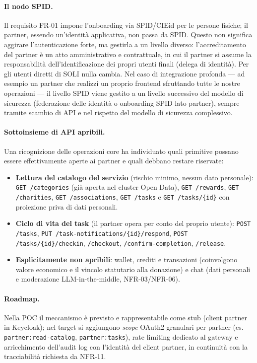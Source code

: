 \documentclass[11pt,a4paper]{article}
\begin{document}
\paragraph{Il nodo SPID.} Il requisito FR-01 impone l'onboarding via SPID/CIEid per le persone fisiche; il partner, essendo un'identit\`a applicativa, non passa da SPID. Questo non significa aggirare l'autenticazione forte, ma gestirla a un livello diverso: l'accreditamento del partner \`e un atto amministrativo e contrattuale, in cui il partner si assume la responsabilit\`a dell'identificazione dei propri utenti finali (delega di identit\`a). Per gli utenti diretti di SOLI nulla cambia. Nel caso di integrazione profonda --- ad esempio un partner che realizzi un proprio frontend sfruttando tutte le nostre operazioni --- il livello SPID viene gestito a un livello successivo del modello di sicurezza (federazione delle identit\`a o onboarding SPID lato partner), sempre tramite scambio di API e nel rispetto del modello di sicurezza complessivo.

\paragraph{Sottoinsieme di API apribili.} Una ricognizione delle operazioni core ha individuato quali primitive possano essere effettivamente aperte ai partner e quali debbano restare riservate:

\begin{itemize}[leftmargin=1.4em]
  \item \textbf{Lettura del catalogo del servizio} (rischio minimo, nessun dato personale): \texttt{GET /categories} (gi\`a aperta nel cluster Open Data), \texttt{GET /rewards}, \texttt{GET /charities}, \texttt{GET /associations}, \texttt{GET /tasks} e \texttt{GET /tasks/\{id\}} con proiezione priva di dati personali.
  \item \textbf{Ciclo di vita del task} (il partner opera per conto del proprio utente): \texttt{POST /tasks}, \texttt{PUT /task-notifications/\{id\}/respond}, \texttt{POST /tasks/\{id\}/checkin}, \texttt{/checkout}, \texttt{/confirm-completion}, \texttt{/release}.
  \item \textbf{Esplicitamente non apribili}: wallet, crediti e transazioni (coinvolgono valore economico e il vincolo statutario alla donazione) e chat (dati personali e moderazione LLM-in-the-middle, NFR-03/NFR-06).
\end{itemize}

\paragraph{Roadmap.} Nella POC il meccanismo \`e previsto e rappresentabile come stub (client partner in Keycloak); nel target si aggiungono \emph{scope} OAuth2 granulari per partner (es. \texttt{partner:read-catalog}, \texttt{partner:tasks}), rate limiting dedicato al gateway e arricchimento dell'audit log con l'identit\`a del client partner, in continuit\`a con la tracciabilit\`a richiesta da NFR-11.
\end{document}
